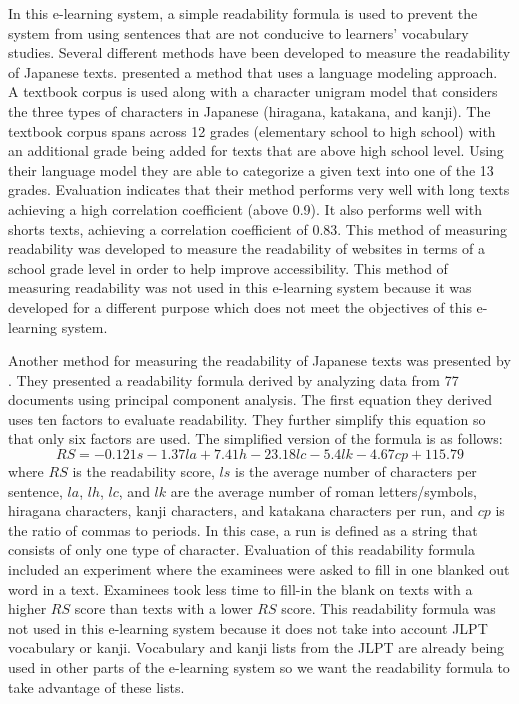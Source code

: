 \documentclass[english]{jnlp_1.4}
\begin{document}
In this e-learning system, a simple readability formula is used to prevent the system from using sentences that are not conducive to learners' vocabulary studies. Several different methods have been developed to measure the readability of Japanese texts. \cite{Inproc_Sato} presented a method that uses a language modeling approach. A textbook corpus is used along with a character unigram model that considers the three types of characters in Japanese (hiragana, katakana, and kanji). The textbook corpus spans across 12 grades (elementary school to high school) with an additional grade being added for texts that are above high school level. Using their language model they are able to categorize a given text into one of the 13 grades. Evaluation indicates that their method performs very well with long texts achieving a high correlation coefficient (above 0.9). It also performs well with shorts texts, achieving a correlation coefficient of 0.83. This method of measuring readability was developed to measure the readability of websites in terms of a school grade level in order to help improve accessibility. This method of measuring readability was not used in this e-learning system because it was developed for a different purpose which does not meet the objectives of this e-learning system.

Another method for measuring the readability of Japanese texts was presented by \cite{Inproc_Tateisi,Article_Tateisi}. They presented a readability formula derived by analyzing data from 77 documents using principal component analysis. The first equation they derived uses ten factors to evaluate readability. They further simplify this equation so that only six factors are used. The simplified version of the formula is as follows:
\begin{equation}\label{rf1}
RS = -0.121s - 1.37la + 7.41h - 23.18lc - 5.4lk - 4.67cp + 115.79
\end{equation}
where $RS$ is the readability score, $ls$ is the average number of characters per sentence, $la$, $lh$, $lc$, and $lk$ are the average number of roman letters/symbols, hiragana characters, kanji characters, and katakana characters per run, and $cp$ is the ratio of commas to periods. In this case, a run is defined as a string that consists of only one type of character. Evaluation of this readability formula included an experiment where the examinees were asked to fill in one blanked out word in a text. Examinees took less time to fill-in the blank on texts with a higher $RS$ score than texts with a lower $RS$ score. This readability formula was not used in this e-learning system because it does not take into account JLPT vocabulary or kanji. Vocabulary and kanji lists from the JLPT are already being used in other parts of the e-learning system so we want the readability formula to take advantage of these lists.
\end{document}

